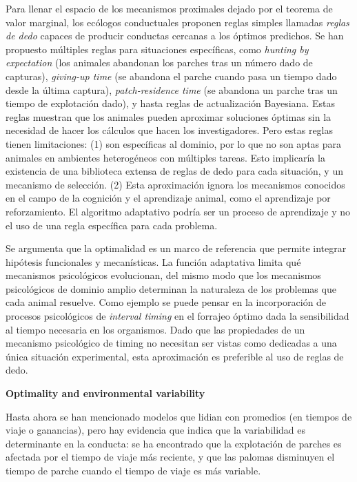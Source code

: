 \documentclass[a4paper,12pt]{article}
\begin{document}
Para llenar el espacio de los mecanismos proximales dejado por el teorema de valor marginal, los ecólogos conductuales proponen reglas simples llamadas {\itshape reglas de dedo} capaces de producir conductas cercanas a los óptimos predichos. Se han propuesto múltiples reglas para situaciones específicas, como {\itshape hunting by expectation} (los animales abandonan los parches tras un número dado de capturas), {\itshape giving-up time} (se abandona el parche cuando pasa un tiempo dado desde la última captura), {\itshape patch-residence time} (se abandona un parche tras un tiempo de explotación dado), y hasta reglas de actualización Bayesiana. Estas reglas muestran que los animales pueden aproximar soluciones óptimas sin la necesidad de hacer los cálculos que hacen los investigadores. Pero estas reglas tienen limitaciones: (1) son específicas al dominio, por lo que no son aptas para animales en ambientes heterogéneos con múltiples tareas. Esto implicaría la existencia de una biblioteca extensa de reglas de dedo para cada situación, y un mecanismo de selección. (2) Esta aproximación ignora los mecanismos conocidos en el campo de la cognición y el aprendizaje animal, como el aprendizaje por reforzamiento. El algoritmo adaptativo podría ser un proceso de aprendizaje y no el uso de una regla específica para cada problema.

Se argumenta que la optimalidad es un marco de referencia que permite integrar hipótesis funcionales y mecanísticas. La función adaptativa limita qué mecanismos psicológicos evolucionan, del mismo modo que los mecanismos psicológicos de dominio amplio determinan la naturaleza de los problemas que cada animal resuelve. Como ejemplo se puede pensar en la incorporación de procesos psicológicos de {\itshape interval timing} en el forrajeo óptimo dada la sensibilidad al tiempo necesaria en los organismos. Dado que las propiedades de un mecanismo psicológico de timing no necesitan ser vistas como dedicadas a una única situación experimental, esta aproximación es preferible al uso de reglas de dedo.

{\bfseries Optimality and environmental variability}

Hasta ahora se han mencionado modelos que lidian con promedios (en tiempos de viaje o ganancias), pero hay evidencia que indica que la variabilidad es determinante en la conducta: se ha encontrado que la explotación de parches es afectada por el tiempo de viaje más reciente, y que las palomas disminuyen el tiempo de parche cuando el tiempo de viaje es más variable.
\end{document}

